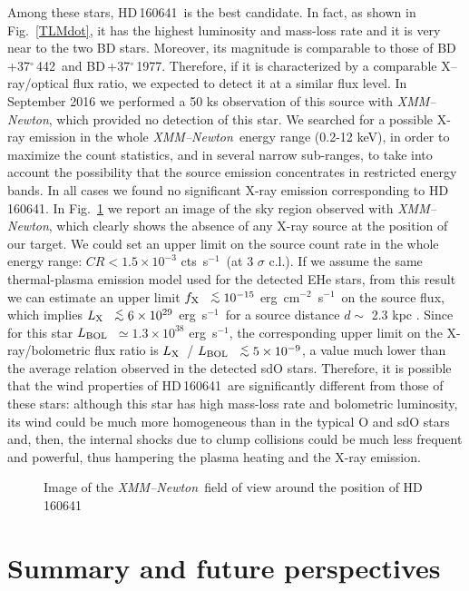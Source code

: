 \documentclass[USenglish,twocolumn]{article}
\def\XMM{{\em XMM--Newton}}
\def\BDone{BD\,+37$^\circ$\,442}
\def\BDtwo{BD\,+37$^\circ$\,1977}
\def\HDtwo{HD\,160641}
\def\flux {\mbox{erg cm$^{-2}$ s$^{-1}$}}
\def\lum {\mbox{erg s$^{-1}$}}
\def\lx {$L_{\rm X}$}
\def\fx {$f_{\rm X}$}
\def\lbol {$L_{\rm BOL}$}
\def\ltsima{$\; \buildrel < \over \sim \;$}
\def\lsim{\lower.5ex\hbox{\ltsima}}
\def\countsec{\hbox{cts s$^{-1}$}}
\begin{document}
Among these stars, \HDtwo\ is the best candidate. In fact, as shown in Fig.~\ref{TLMdot}, it has the highest luminosity and mass-loss rate and it is very near to the two BD stars. Moreover, its magnitude is comparable to those of \BDone\ and \BDtwo. Therefore, if it is characterized by a comparable X--ray/optical flux ratio, we expected to detect it at a similar flux level. In September 2016 we performed a 50 ks observation of this source with \XMM, which provided no detection of this star. We searched for a possible X-ray emission in the whole \XMM\ energy range (0.2-12 keV), in order to maximize the count statistics, and in several narrow sub-ranges, to take into account the possibility that the source emission concentrates in restricted energy bands. In all cases we found no significant X-ray emission corresponding to \HDtwo. In Fig.~\ref{HD160641} we report an image of the sky region observed with \XMM, which clearly shows the absence of any X-ray source at the position of our target. We could set an upper limit on the source count rate in the whole energy range: $ CR < 1.5 \times 10^{-3}$ \countsec\ (at 3 $\sigma$ c.l.). If we assume the same thermal-plasma emission model used for the detected EHe stars, from this result we can estimate an upper limit \fx\ $\lsim 10^{-15}$ \flux\ on the source flux, which implies \lx\ $\lsim 6\times10^{29}$ \lum\ for a source distance $d \sim$ 2.3 kpc \citep{JefferyHamann10}. Since for this star \lbol\ $\simeq 1.3\times10^{38}$ \lum, the corresponding upper limit on the X-ray/bolometric flux ratio is \lx\ / \lbol\ $\lsim 5\times10^{-9}$, a value much lower than the average relation observed in the detected sdO stars. Therefore, it is possible that the wind properties of \HDtwo\ are significantly different from those of these stars: although this star has high mass-loss rate and bolometric luminosity, its wind could be much more homogeneous than in the typical O and sdO stars and, then, the internal shocks due to clump collisions could be much less frequent and powerful, thus hampering the plasma heating and the X-ray emission.

\begin{figure}[t!]
\centering
{}
\caption{\footnotesize{Image of the \XMM\ field of view around the position of \HDtwo}}
\label{HD160641}
\end{figure}

\section{Summary and future perspectives}
\end{document}

